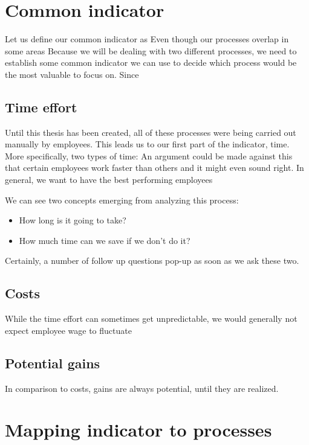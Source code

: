 \documentclass[12pt,oneside]{fithesis2}
\begin{document}
\section{Common indicator}
Let us define our common indicator as 
Even though our processes overlap in some areas
Because we will be dealing with two different processes, we need to establish some common indicator we can use to decide which process would be the most valuable to focus on. Since



\subsection{Time effort}
Until this thesis has been created, all of these processes were being carried out manually by employees. This leads us to our first part of the indicator, time.
More specifically, two types of time:
An argument could be made against this that certain employees work faster than others and it might even sound right. In general, we want to have the best performing employees

\newline\newline
We can see two concepts emerging from analyzing this process:
\begin{itemize}
    \setlength\itemsep{0em}
    \item How long is it going to take?
    \item How much time can we save if we don't do it?
\end{itemize}

Certainly, a number of follow up questions pop-up as soon as we ask these two. 


\subsection{Costs}
While the time effort can sometimes get unpredictable, we would generally not expect employee wage to fluctuate 

\subsection{Potential gains}
In comparison to costs, gains are always potential, until they are realized. 


\section{Mapping indicator to processes}
\end{document}
